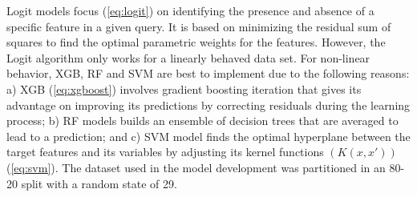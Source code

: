 \FloatBarrier %

Logit models focus (\autoref{eq:logit}) on identifying the presence and absence of a specific feature in a given query. It is based on minimizing the residual sum of squares to find the optimal parametric weights for the features. However, the Logit algorithm only works for a linearly behaved data set. For non-linear behavior, XGB, RF and SVM are best to implement due to the following reasons: a) XGB (\autoref{eq:xgboost}) involves gradient boosting iteration that gives its advantage on improving its predictions by correcting residuals during the learning process; b) RF models builds an ensemble of decision trees that are averaged to lead to a prediction; and c) SVM model finds the optimal hyperplane between the target features and its variables by adjusting its kernel functions $(K(x,x'))$(\ref{eq:svm}). The dataset used in the model development was partitioned in an 80-20 split with a random state of 29.




